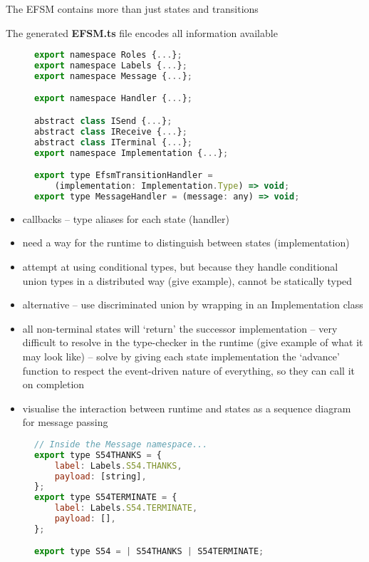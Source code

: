 The EFSM contains more than just states and transitions

The generated \textbf{EFSM.ts} file encodes all information
available 

\begin{figure}
\begin{lstlisting}[language=javascript,tabsize=2]
export namespace Roles {...};
export namespace Labels {...};
export namespace Message {...};

export namespace Handler {...};

abstract class ISend {...};
abstract class IReceive {...};
abstract class ITerminal {...};
export namespace Implementation {...};

export type EfsmTransitionHandler =
	(implementation: Implementation.Type) => void;
export type MessageHandler = (message: any) => void;
\end{lstlisting}
\label{lst:nodeefsmfile}
\end{figure}

\begin{itemize}
\item callbacks -- type aliases for each state (handler)
\item need a way for the runtime to distinguish between states (implementation)
\item attempt at using conditional types, but because they handle conditional union types in a distributed way (give example), cannot be statically typed
\item alternative -- use discriminated union by wrapping in an Implementation class
\item all non-terminal states will `return' the successor implementation -- very difficult to resolve in the type-checker in the runtime (give example of what it may look like) -- solve by giving each state implementation the `advance' function to respect the event-driven nature of everything, so they can call it on completion
\item visualise the interaction between runtime and states as a sequence diagram for message passing
\end{itemize}

\begin{figure}[!ht]
\begin{lstlisting}[language=javascript, tabsize=2]
// Inside the Message namespace...
export type S54THANKS = {
	label: Labels.S54.THANKS,
	payload: [string],
};
export type S54TERMINATE = {
	label: Labels.S54.TERMINATE,
	payload: [],
};

export type S54 = | S54THANKS | S54TERMINATE;
\end{lstlisting}
\end{figure}

